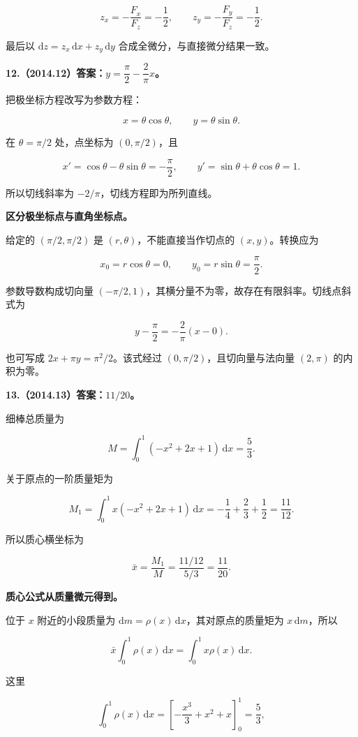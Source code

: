 \documentclass[UTF8,11pt,fontset=windows]{ctexart}
\begin{document}
$$
z_x=-\frac{F_x}{F_z}=-\frac12,
\qquad z_y=-\frac{F_y}{F_z}=-\frac12.
$$

最后以 $\mathrm dz=z_x\,\mathrm dx+z_y\,\mathrm dy$ 合成全微分，与直接微分结果一致。

\clearpage

\textbf{12.（2014.12）答案：$y=\dfrac\pi2-\dfrac2\pi x$。}

把极坐标方程改写为参数方程：

$$
x=\theta\cos\theta,\qquad y=\theta\sin\theta.
$$

在 $\theta=\pi/2$ 处，点坐标为 $(0,\pi/2)$，且

$$
x'=\cos\theta-\theta\sin\theta=-\frac\pi2,
\qquad y'=\sin\theta+\theta\cos\theta=1.
$$

所以切线斜率为 $-2/\pi$，切线方程即为所列直线。

\textbf{区分极坐标点与直角坐标点。}

给定的 $(\pi/2,\pi/2)$ 是 $(r,\theta)$，不能直接当作切点的 $(x,y)$。转换应为

$$
x_0=r\cos\theta=0,\qquad y_0=r\sin\theta=\frac\pi2.
$$

参数导数构成切向量 $(-\pi/2,1)$，其横分量不为零，故存在有限斜率。切线点斜式为

$$
y-\frac\pi2=-\frac2\pi(x-0).
$$

也可写成 $2x+\pi y=\pi^2/2$。该式经过 $(0,\pi/2)$，且切向量与法向量 $(2,\pi)$ 的内积为零。

\clearpage

\textbf{13.（2014.13）答案：$11/20$。}

细棒总质量为

$$
M=\int_0^1(-x^2+2x+1)\,\mathrm dx=\frac53.
$$

关于原点的一阶质量矩为

$$
M_1=\int_0^1x(-x^2+2x+1)\,\mathrm dx
=-\frac14+\frac23+\frac12=\frac{11}{12}.
$$

所以质心横坐标为

$$
\bar x=\frac{M_1}{M}=\frac{11/12}{5/3}=\frac{11}{20}.
$$

\textbf{质心公式从质量微元得到。}

位于 $x$ 附近的小段质量为 $\mathrm dm=\rho(x)\,\mathrm dx$，其对原点的质量矩为 $x\,\mathrm dm$，所以

$$
\bar x\int_0^1\rho(x)\,\mathrm dx
=\int_0^1x\rho(x)\,\mathrm dx.
$$

这里

$$
\int_0^1\rho(x)\,\mathrm dx
=\left[-\frac{x^3}{3}+x^2+x\right]_0^1=\frac53,
$$
\end{document}
